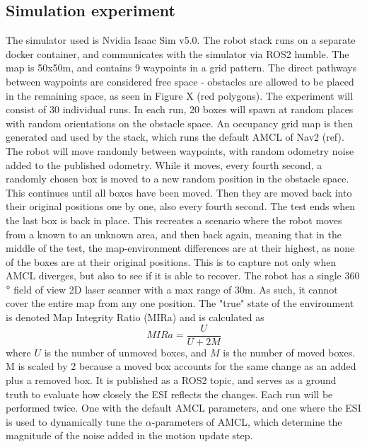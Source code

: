 \subsection{Simulation experiment}
The simulator used is Nvidia Isaac Sim v5.0. The robot stack runs on a separate docker container, and communicates with the simulator via ROS2 humble.
The map is 50x50m, and contains 9 waypoints in a grid pattern. The direct pathways between waypoints are considered free space - obstacles are allowed
to be placed in the remaining space, as seen in Figure X (red polygons). The experiment will consist of 30 individual runs. In each run,
20 boxes will spawn at random places with random orientations on the obstacle space. An occupancy grid map is then generated and used by the stack, which
runs the default AMCL of Nav2 (ref). The robot will move randomly between waypoints, with random odometry noise added to the published odometry. 
While it moves, every fourth second, a randomly chosen box
is moved to a new random position in the obstacle space. This continues until all boxes have been moved. Then they are moved 
back into their original positions one by one, also every fourth second. The test ends when the last box is back in place. This recreates a scenario
where the robot moves from a known to an unknown area, and then back again, meaning that in the middle of the test, the map-environment differences 
are at their highest, as none of the boxes are at their original positions. This is to capture not only when AMCL diverges, 
but also to see if it is able to recover. The robot has a single 360$\degree$ field of view 2D laser scanner with a max range of 30m. As such, it cannot cover the entire map 
from any one position. The "true" state of the environment is denoted Map Integrity Ratio (MIRa) and is calculated as 
\begin{equation}
    MIRa=\dfrac{U}{U+2M}
\end{equation} 
where $U$ is the number of unmoved boxes, and $M$ is the number of moved boxes. M is scaled by 2 because a moved box
accounts for the same change as an added plus a removed box. 
It is published as a ROS2 topic, and serves as a ground truth to evaluate how closely the ESI reflects the changes. 
Each run will be performed twice. One with the default AMCL parameters, and one where the ESI is used to dynamically tune the $\alpha$-parameters of AMCL, which 
determine the magnitude of the noise added in the motion update step. 
